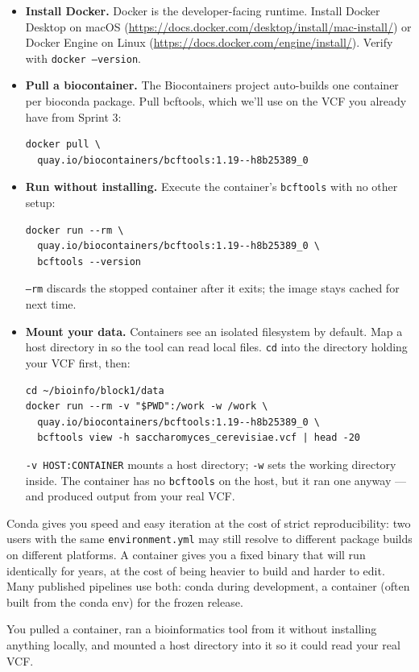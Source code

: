 \begin{itemize}[nosep]
  \item \textbf{Install Docker.} Docker is the developer-facing runtime. Install Docker Desktop on macOS (\url{https://docs.docker.com/desktop/install/mac-install/}) or Docker Engine on Linux (\url{https://docs.docker.com/engine/install/}). Verify with \texttt{docker --version}.
  \item \textbf{Pull a biocontainer.} The Biocontainers project auto-builds one container per bioconda package. Pull bcftools, which we'll use on the VCF you already have from Sprint 3:
    \begin{lstlisting}
docker pull \
  quay.io/biocontainers/bcftools:1.19--h8b25389_0
    \end{lstlisting}
  \item \textbf{Run without installing.} Execute the container's \texttt{bcftools} with no other setup:
    \begin{lstlisting}
docker run --rm \
  quay.io/biocontainers/bcftools:1.19--h8b25389_0 \
  bcftools --version
    \end{lstlisting}
    \texttt{--rm} discards the stopped container after it exits; the image stays cached for next time.
  \item \textbf{Mount your data.} Containers see an isolated filesystem by default. Map a host directory in so the tool can read local files. \texttt{cd} into the directory holding your VCF first, then:
    \begin{lstlisting}
cd ~/bioinfo/block1/data
docker run --rm -v "$PWD":/work -w /work \
  quay.io/biocontainers/bcftools:1.19--h8b25389_0 \
  bcftools view -h saccharomyces_cerevisiae.vcf | head -20
    \end{lstlisting}
    \texttt{-v HOST:CONTAINER} mounts a host directory; \texttt{-w} sets the working directory inside. The container has no \texttt{bcftools} on the host, but it ran one anyway --- and produced output from your real VCF.
\end{itemize}
\begin{tipbox}[Conda vs.\ container --- when to reach for which]
Conda gives you speed and easy iteration at the cost of strict reproducibility: two users with the same \texttt{environment.yml} may still resolve to different package builds on different platforms. A container gives you a fixed binary that will run identically for years, at the cost of being heavier to build and harder to edit. Many published pipelines use both: conda during development, a container (often built from the conda env) for the frozen release.
\end{tipbox}
\begin{winbox}[Checkpoint]
You pulled a container, ran a bioinformatics tool from it without installing anything locally, and mounted a host directory into it so it could read your real VCF.
\end{winbox}

